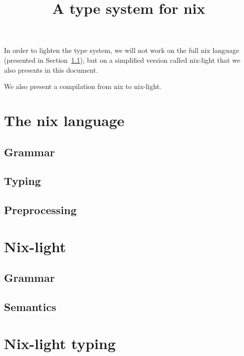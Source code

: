 

\title{A type system for nix}


\maketitle

\tableofcontents

\pagebreak

In order to lighten the type system, we will not work on the full nix language
(presented in Section~\ref{sec:nix-grammar}), but on a simplified version
called nix-light that we also presents in this document.

We also present a compilation from nix to nix-light.

\section{The nix language}

\subsection{Grammar}
\label{sec:nix-grammar}


\subsection{Typing}

\subsection{Preprocessing}


\section{Nix-light}

\subsection{Grammar}
\label{sec:nix-light-grammar}


\subsection{Semantics}


\section{Nix-light typing}

